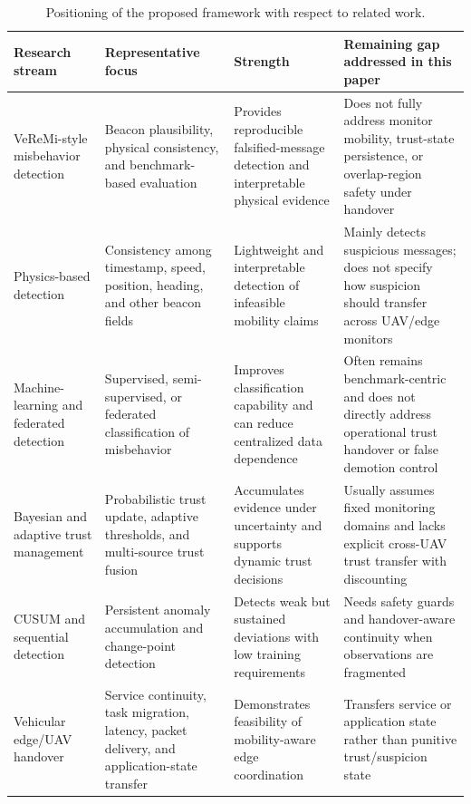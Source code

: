 \documentclass[journal]{IEEEtran}
\begin{document}
\begin{table}[!t]
\centering
\caption{Positioning of the proposed framework with respect to related work.}
\label{tab:related_work_gap}
\begin{tabularx}{\textwidth}{l X X X}
\toprule
\textbf{Research stream} & \textbf{Representative focus} & \textbf{Strength} & \textbf{Remaining gap addressed in this paper} \\
\midrule
VeReMi-style misbehavior detection
& Beacon plausibility, physical consistency, and benchmark-based evaluation
& Provides reproducible falsified-message detection and interpretable physical evidence
& Does not fully address monitor mobility, trust-state persistence, or overlap-region safety under handover \\

Physics-based detection
& Consistency among timestamp, speed, position, heading, and other beacon fields
& Lightweight and interpretable detection of infeasible mobility claims
& Mainly detects suspicious messages; does not specify how suspicion should transfer across UAV/edge monitors \\

Machine-learning and federated detection
& Supervised, semi-supervised, or federated classification of misbehavior
& Improves classification capability and can reduce centralized data dependence
& Often remains benchmark-centric and does not directly address operational trust handover or false demotion control \\

Bayesian and adaptive trust management
& Probabilistic trust update, adaptive thresholds, and multi-source trust fusion
& Accumulates evidence under uncertainty and supports dynamic trust decisions
& Usually assumes fixed monitoring domains and lacks explicit cross-UAV trust transfer with discounting \\

CUSUM and sequential detection
& Persistent anomaly accumulation and change-point detection
& Detects weak but sustained deviations with low training requirements
& Needs safety guards and handover-aware continuity when observations are fragmented \\

Vehicular edge/UAV handover
& Service continuity, task migration, latency, packet delivery, and application-state transfer
& Demonstrates feasibility of mobility-aware edge coordination
& Transfers service or application state rather than punitive trust/suspicion state \\


\end{tabularx}
\end{table}
\end{document}

